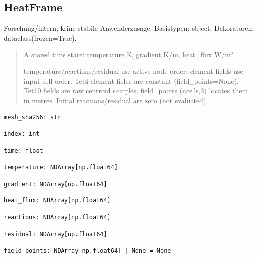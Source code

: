 \subsection{HeatFrame}
Forschung/intern; keine stabile Anwenderzusage.
Basistypen: object. Dekoratoren: dataclass(frozen=True).
\begin{quote}
A stored time state: temperature K, gradient K/m, heat\_flux W/m².\par temperature/reactions/residual use active node order; element fields use input cell order. Tet4 element fields are constant (field\_points=None). Tet10 fields are raw centroid samples; field\_points (ncells,3) locates them in metres. Initial reactions/residual are zero (not evaluated).
\end{quote}
\begin{lstlisting}
mesh_sha256: str
\end{lstlisting}
\begin{lstlisting}
index: int
\end{lstlisting}
\begin{lstlisting}
time: float
\end{lstlisting}
\begin{lstlisting}
temperature: NDArray[np.float64]
\end{lstlisting}
\begin{lstlisting}
gradient: NDArray[np.float64]
\end{lstlisting}
\begin{lstlisting}
heat_flux: NDArray[np.float64]
\end{lstlisting}
\begin{lstlisting}
reactions: NDArray[np.float64]
\end{lstlisting}
\begin{lstlisting}
residual: NDArray[np.float64]
\end{lstlisting}
\begin{lstlisting}
field_points: NDArray[np.float64] | None = None
\end{lstlisting}

